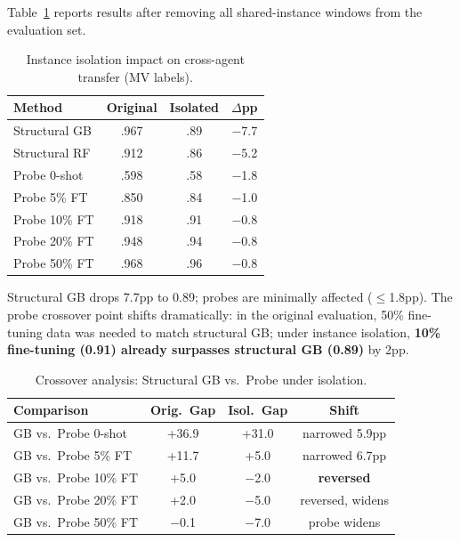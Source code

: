 \documentclass[11pt,a4paper]{article}
\begin{document}
Table~\ref{tab:isolation} reports results after removing all shared-instance windows from the evaluation set.

\begin{table}[t]
\centering
\small
\caption{Instance isolation impact on cross-agent transfer (MV labels).}
\label{tab:isolation}
\begin{tabular}{lccc}
\toprule
\textbf{Method} & \textbf{Original} & \textbf{Isolated} & \textbf{$\Delta$pp} \\
\midrule
Structural GB    & .967 & .89 & $-$7.7 \\
Structural RF    & .912 & .86 & $-$5.2 \\
\midrule
Probe 0-shot     & .598 & .58 & $-$1.8 \\
Probe 5\% FT    & .850 & .84 & $-$1.0 \\
Probe 10\% FT   & .918 & .91 & $-$0.8 \\
Probe 20\% FT   & .948 & .94 & $-$0.8 \\
Probe 50\% FT   & .968 & .96 & $-$0.8 \\
\bottomrule
\end{tabular}
\end{table}

Structural GB drops 7.7pp to 0.89; probes are minimally affected ($\leq$1.8pp).
The probe crossover point shifts dramatically: in the original evaluation, 50\% fine-tuning data was needed to match structural GB; under instance isolation, \textbf{10\% fine-tuning (0.91) already surpasses structural GB (0.89)} by 2pp.

\begin{table}[t]
\centering
\small
\caption{Crossover analysis: Structural GB vs.\ Probe under isolation.}
\label{tab:crossover}
\begin{tabular}{lccc}
\toprule
\textbf{Comparison} & \textbf{Orig.\ Gap} & \textbf{Isol.\ Gap} & \textbf{Shift} \\
\midrule
GB vs.\ Probe 0-shot  & +36.9 & +31.0 & narrowed 5.9pp \\
GB vs.\ Probe 5\% FT & +11.7 & +5.0  & narrowed 6.7pp \\
GB vs.\ Probe 10\% FT & +5.0  & $-$2.0 & \textbf{reversed} \\
GB vs.\ Probe 20\% FT & +2.0  & $-$5.0 & reversed, widens \\
GB vs.\ Probe 50\% FT & $-$0.1 & $-$7.0 & probe widens \\
\bottomrule
\end{tabular}
\end{table}
\end{document}
